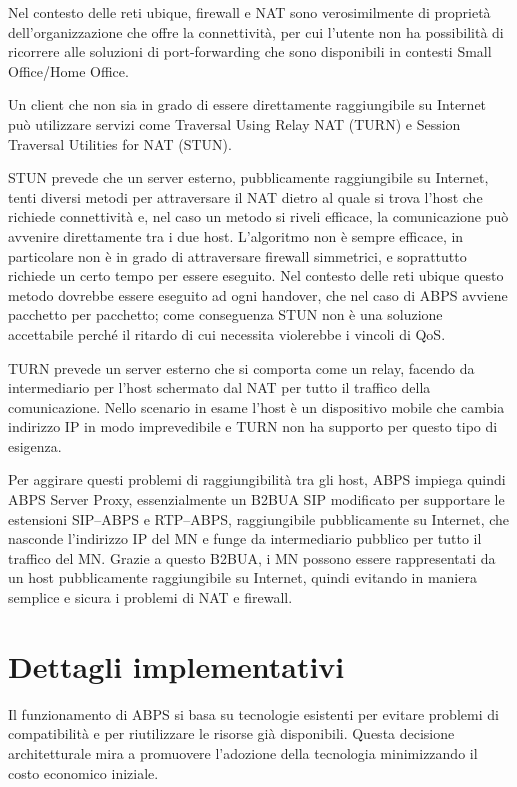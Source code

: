 \documentclass[12pt,a4paper,openright,twoside,draft]{book}
\begin{document}
Nel contesto delle reti ubique, firewall e NAT sono verosimilmente di
proprietà dell'organizzazione che offre la connettività, per cui
l'utente non ha possibilità di ricorrere alle soluzioni di
port-forwarding che sono disponibili in contesti Small Office/Home
Office.

Un client che non sia in grado di essere direttamente raggiungibile su
Internet può utilizzare servizi come Traversal Using Relay NAT (TURN)
e Session Traversal Utilities for NAT (STUN).

STUN prevede che un server esterno, pubblicamente raggiungibile su
Internet, tenti diversi metodi per attraversare il NAT dietro al quale
si trova l'host che richiede connettività e, nel caso un metodo si
riveli efficace, la comunicazione può avvenire direttamente tra i due
host. L'algoritmo non è sempre efficace, in particolare non è in grado
di attraversare firewall simmetrici, e soprattutto richiede un certo
tempo per essere eseguito. Nel contesto delle reti ubique questo
metodo dovrebbe essere eseguito ad ogni handover, che nel caso di ABPS
avviene pacchetto per pacchetto; come conseguenza STUN non è una
soluzione accettabile perché il ritardo di cui necessita violerebbe i
vincoli di QoS.

TURN prevede un server esterno che si comporta come un relay, facendo
da intermediario per l'host schermato dal NAT per tutto il traffico
della comunicazione. Nello scenario in esame l'host è un dispositivo
mobile che cambia indirizzo IP in modo imprevedibile e TURN non ha
supporto per questo tipo di esigenza.

Per aggirare questi problemi di raggiungibilità tra gli host, ABPS
impiega quindi ABPS Server Proxy, essenzialmente un B2BUA SIP
modificato per supportare le estensioni SIP--ABPS e RTP--ABPS,
raggiungibile pubblicamente su Internet, che nasconde l'indirizzo IP
del MN e funge da intermediario pubblico per tutto il traffico del
MN. Grazie a questo B2BUA, i MN possono essere rappresentati da un
host pubblicamente raggiungibile su Internet, quindi evitando in
maniera semplice e sicura i problemi di NAT e firewall.

\section{Dettagli implementativi}

Il funzionamento di ABPS si basa su tecnologie esistenti per evitare
problemi di compatibilità e per riutilizzare le risorse già
disponibili. Questa decisione architetturale mira a promuovere
l'adozione della tecnologia minimizzando il costo economico iniziale.
\end{document}
